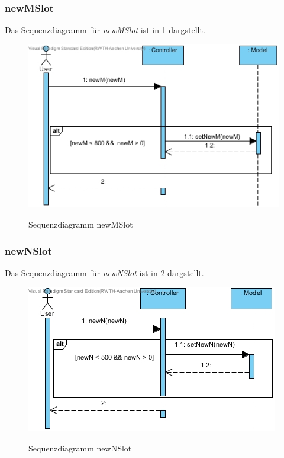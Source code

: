 \subsubsection*{newMSlot}

Das Sequenzdiagramm für \emph{newMSlot} ist in \ref{Sequenzdiagramm newMSlot} dargstellt.

\begin{figure}[H]
	\centering
	\includegraphics[scale=.6]{Bilder/Controller__newMSlot().jpg}\\
	\caption{Sequenzdiagramm newMSlot}
	\label{Sequenzdiagramm newMSlot}
\end{figure}

\subsubsection*{newNSlot}

Das Sequenzdiagramm für \emph{newNSlot} ist in \ref{Sequenzdiagramm newNSlot} dargstellt.

\begin{figure}[H]
	\centering
	\includegraphics[scale=.6]{Bilder/Controller__newNSlot().jpg}\\
	\caption{Sequenzdiagramm newNSlot}
	\label{Sequenzdiagramm newNSlot}
\end{figure}

